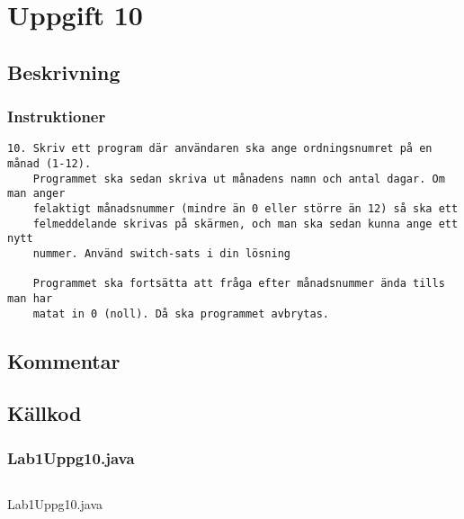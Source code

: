 \section{Uppgift 10}\label{uppgift-10}

\subsection{Beskrivning}

\subsubsection*{Instruktioner}
\begin{verbatim}
10. Skriv ett program där användaren ska ange ordningsnumret på en månad (1-12).
    Programmet ska sedan skriva ut månadens namn och antal dagar. Om man anger
    felaktigt månadsnummer (mindre än 0 eller större än 12) så ska ett
    felmeddelande skrivas på skärmen, och man ska sedan kunna ange ett nytt
    nummer. Använd switch-sats i din lösning

    Programmet ska fortsätta att fråga efter månadsnummer ända tills man har
    matat in 0 (noll). Då ska programmet avbrytas.
\end{verbatim}


\subsection{Kommentar}

\subsection{Källkod}\label{uppgift-10_src}
\subsubsection*{Lab1Uppg10.java}
\begin{listing}[H]
    \inputminted[]{java}{src/Lab1Uppg10.java}
    \caption{Lab1Uppg10.java}
    \label{Uppg10src}
\end{listing}
